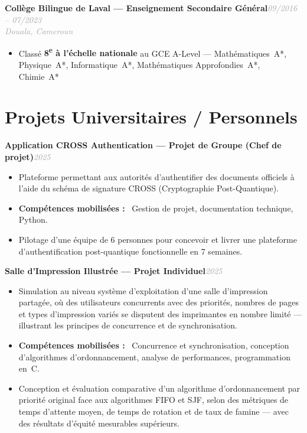 \documentclass[10pt, a4paper]{article}
\newcommand{\entryhead}[2]{%
  \noindent\textbf{#1}\hfill{\small\textit{\textcolor{darkgray}{#2}}}\\[-4pt]%
}
\newcommand{\entrysub}[1]{%
  {\small\textit{\textcolor{darkgray}{#1}}}\\[2pt]%
}
\newcommand{\blabel}[1]{\textbf{#1}\ }
\begin{document}
\vspace{4pt}
\entryhead{Collège Bilingue de Laval — Enseignement Secondaire Général}{09/2016 -- 07/2023}
\entrysub{Douala, Cameroun}
\begin{itemize}
  \item Classé \textbf{8\textsuperscript{e} à l'échelle nationale} au GCE A-Level —
        Mathématiques~A*, Physique~A*, Informatique~A*, Mathématiques Approfondies~A*, Chimie~A*
\end{itemize}

\section{Projets Universitaires / Personnels}

\entryhead{Application CROSS Authentication \normalfont\small— Projet de Groupe (Chef de projet)}{2025}
\begin{itemize}
  \item Plateforme permettant aux autorités d'authentifier des documents officiels à l'aide du
        schéma de signature CROSS (Cryptographie Post-Quantique).
  \item \blabel{Compétences mobilisées :} Gestion de projet, documentation technique, Python.
  \item Pilotage d'une équipe de 6 personnes pour concevoir et livrer une plateforme
        d'authentification post-quantique fonctionnelle en 7 semaines.
\end{itemize}

\vspace{4pt}
\entryhead{Salle d'Impression Illustrée \normalfont\small— Projet Individuel}{2025}
\begin{itemize}
  \item Simulation au niveau système d'exploitation d'une salle d'impression partagée, où des
        utilisateurs concurrents avec des priorités, nombres de pages et types d'impression variés
        se disputent des imprimantes en nombre limité — illustrant les principes de concurrence
        et de synchronisation.
  \item \blabel{Compétences mobilisées :} Concurrence et synchronisation, conception d'algorithmes
        d'ordonnancement, analyse de performances, programmation en~C.
  \item Conception et évaluation comparative d'un algorithme d'ordonnancement par priorité original
        face aux algorithmes FIFO et SJF, selon des métriques de temps d'attente moyen, de temps
        de rotation et de taux de famine — avec des résultats d'équité mesurables supérieurs.
\end{itemize}
\end{document}
